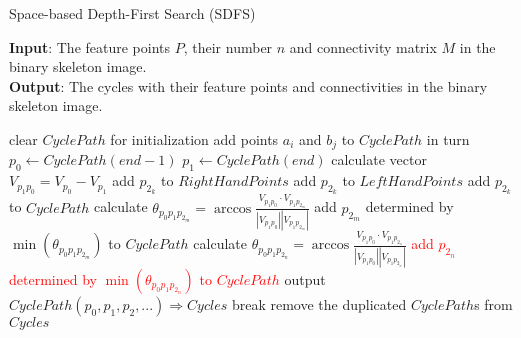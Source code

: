 \documentclass[12pt]{article}
\begin{document}
\begin{algorithm}[!ht]
\caption{Space-based Depth-First Search (SDFS)}\label{alg:sdfs}
\textbf{Input}: The feature points $P$, their number $n$ and connectivity matrix $M$ in the binary skeleton image.\\
\textbf{Output}: The cycles with their feature points and connectivities in the binary skeleton image.
\begin{algorithmic}[1]
\STATE clear $CyclePath$ for initialization
\STATE add points $a_i$ and $b_j$ to $CyclePath$ in turn
\STATE $p_0\leftarrow CyclePath(end-1)$
\STATE $p_1\leftarrow CyclePath(end)$
\STATE calculate vector $V_{p_1p_0}=V_{p_0}-V_{p_1}$
\STATE add $p_{2_k}$ to $RightHandPoints$
\STATE add $p_{2_k}$ to $LeftHandPoints$
\ELSE
\STATE add $p_{2_k}$ to $CyclePath$
\ENDIF
\ENDFOR
{}
\STATE calculate $\theta_{p_0p_1p_{2_m}}=\arccos{\frac{V_{p_1p_0}\cdot V_{p_1p_{2_m}}}{\left|V_{p_1p_0}\right|\left|V_{p_1p_{2_m}}\right|}}$
\ENDFOR
\STATE add $p_{2_m}$ determined by $\min{\left(\theta_{p_0p_1p_{2_m}}\right)}$ to $CyclePath$
\STATE calculate $\theta_{p_0p_1p_{2_n}}=\arccos{\frac{V_{p_1p_0}\cdot V_{p_1p_{2_n}}}{\left|V_{p_1p_0}\right|\left|V_{p_1p_{2_n}}\right|}}$
\ENDFOR
\STATE \textcolor{red}{add $p_{2_n}$ determined by $\min{\left(\theta_{p_0p_1p_{2_n}}\right)}$ to $CyclePath$}
\ENDIF
{}
\IF {\textcolor{red}{$checkCyclePath(p_0,p_1,p_2,...)$}}
\STATE output $CyclePath(p_0,p_1,p_2,...) \Rightarrow Cycles$
\STATE break
\ENDIF
\ENDIF
\ENDWHILE
\ENDFOR  
\ENDFOR
\STATE remove the duplicated $CyclePath$s from $Cycles$
\end{algorithmic}
\end{algorithm}


\end{document}
